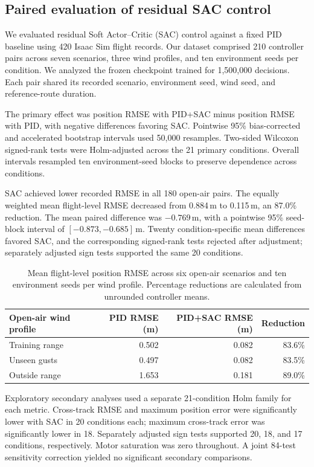 \subsection{Paired evaluation of residual SAC control}
We evaluated residual Soft Actor--Critic (SAC) control against a fixed PID baseline using 420 Isaac Sim flight records. Our dataset comprised 210 controller pairs across seven scenarios, three wind profiles, and ten environment seeds per condition. We analyzed the frozen checkpoint trained for 1,500,000 decisions. Each pair shared its recorded scenario, environment seed, wind seed, and reference-route duration.

The primary effect was position RMSE with PID+SAC minus position RMSE with PID, with negative differences favoring SAC. Pointwise 95\% bias-corrected and accelerated bootstrap intervals used 50,000 resamples. Two-sided Wilcoxon signed-rank tests were Holm-adjusted across the 21 primary conditions. Overall intervals resampled ten environment-seed blocks to preserve dependence across conditions.

SAC achieved lower recorded RMSE in all 180 open-air pairs. The equally weighted mean flight-level RMSE decreased from 0.884\,m to 0.115\,m, an 87.0\% reduction. The mean paired difference was $-0.769$\,m, with a pointwise 95\% seed-block interval of $[-0.873,-0.685]$\,m. Twenty condition-specific mean differences favored SAC, and the corresponding signed-rank tests rejected after adjustment; separately adjusted sign tests supported the same 20 conditions.

\begin{table}[htbp]
\centering
\small
\begin{tabular}{lrrr}
\hline
Open-air wind profile & PID RMSE (m) & PID+SAC RMSE (m) & Reduction \\
\hline
Training range & 0.502 & 0.082 & 83.6\% \\
Unseen gusts & 0.497 & 0.082 & 83.5\% \\
Outside range & 1.653 & 0.181 & 89.0\% \\
\hline
\end{tabular}
\caption{Mean flight-level position RMSE across six open-air scenarios and ten environment seeds per wind profile. Percentage reductions are calculated from unrounded controller means.}
\label{tab:paired-sac-open-air}
\end{table}

Exploratory secondary analyses used a separate 21-condition Holm family for each metric. Cross-track RMSE and maximum position error were significantly lower with SAC in 20 conditions each; maximum cross-track error was significantly lower in 18. Separately adjusted sign tests supported 20, 18, and 17 conditions, respectively. Motor saturation was zero throughout. A joint 84-test sensitivity correction yielded no significant secondary comparisons.

